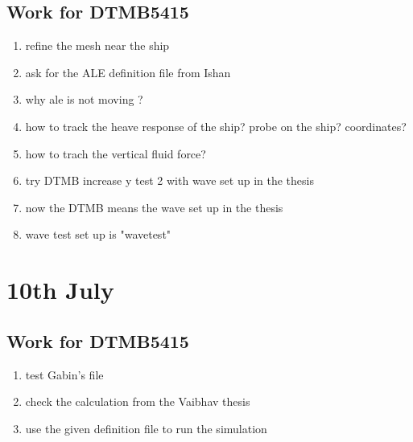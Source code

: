 \documentclass[12pt]{article} %
\begin{document}
\subsection{Work for DTMB5415}
\begin{enumerate}
    \item refine the mesh near the ship
    \item ask for the ALE definition file from Ishan
    \item why ale is not moving ?
    \item how to track the heave response of the ship? probe on the ship? coordinates?
    \item how to trach the vertical fluid force? 
    \item try DTMB increase y test 2 with wave set up in the thesis
    \item now the DTMB means the wave set up in the thesis
    \item wave test set up is "wavetest"
\end{enumerate}
\section{10th July}
\subsection{Work for DTMB5415}
\begin{enumerate}
    \item test Gabin's file
    \item check the calculation from the Vaibhav thesis
    \item use the given definition file to run the simulation
\end{enumerate}
\end{document}
